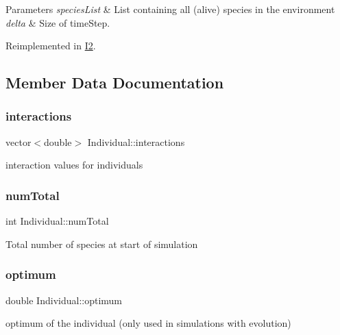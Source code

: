\begin{DoxyParams}{Parameters}
{\em species\+List} & List containing all (alive) species in the environment \\
\hline
{\em delta} & Size of time\+Step. \\
\hline
\end{DoxyParams}


Reimplemented in \hyperlink{classI2_ac747249e352a954b96a530537c60d3b1}{I2}.



\subsection{Member Data Documentation}
\hypertarget{classIndividual_ac832077568d1e59f979af3fe6bd7e3e6}{}\label{classIndividual_ac832077568d1e59f979af3fe6bd7e3e6} 
\subsubsection{\texorpdfstring{interactions}{interactions}}
{\footnotesize\ttfamily vector$<$double$>$ Individual\+::interactions}

interaction values for individuals \hypertarget{classIndividual_a78e6327a339aa73f73d81e991b3fede2}{}\label{classIndividual_a78e6327a339aa73f73d81e991b3fede2} 
\subsubsection{\texorpdfstring{num\+Total}{numTotal}}
{\footnotesize\ttfamily int Individual\+::num\+Total}

Total number of species at start of simulation \hypertarget{classIndividual_adc6dbb93690c48fbba745ce0fcf6d5b0}{}\label{classIndividual_adc6dbb93690c48fbba745ce0fcf6d5b0} 
\subsubsection{\texorpdfstring{optimum}{optimum}}
{\footnotesize\ttfamily double Individual\+::optimum}

optimum of the individual (only used in simulations with evolution) \hypertarget{classIndividual_a2a7068df27211ad0b2e869a3c628cd9f}{}\label{classIndividual_a2a7068df27211ad0b2e869a3c628cd9f} 
